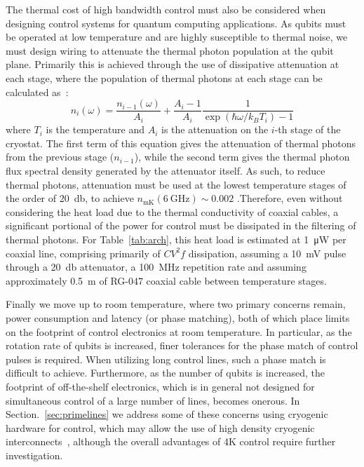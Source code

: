 The thermal cost of high bandwidth control must also be considered when designing control systems for quantum computing applications. As qubits must be operated at low
temperature and are highly susceptible to thermal noise, we must design wiring to attenuate the thermal photon population at the qubit plane. Primarily this is achieved
through the use of dissipative attenuation at each stage, where the population of thermal photons at each stage can be calculated as~\cite{Krinner2019}:
\begin{equation}
  n_i(\omega) = \frac{n_{i-1}(\omega)}{A_i} + \frac{A_i - 1}{A_i}\frac{1}{\exp(\hbar\omega/k_BT_i) - 1}
\end{equation}
where $T_i$ is the temperature and $A_i$ is the attenuation on the $i$-th stage of the cryostat. The first term of this equation gives the attenuation of thermal photons
from the previous stage ($n_{i-1}$), while the second term gives the thermal photon flux spectral density generated by the attenuator itself. As such, to reduce thermal photons,
attenuation must be used at the lowest temperature stages of the order of \SI{20}{\decibel}, to achieve $n_\textrm{mK}(\SI{6}{\giga\hertz}) \sim 0.002$ .Therefore,
even without considering the heat load due to the thermal conductivity of coaxial cables, a significant portional of the power for control must be dissipated
in the filtering of thermal photons. For Table~\ref{tab:arch}, this heat load is estimated at \SI{1}{\micro\watt} per coaxial line, comprising primarily of
$CV^2f$ dissipation, assuming a \SI{10}{\milli\volt} pulse through a \SI{20}{\decibel} attenuator, a \SI{100}{\mega\hertz} repetition rate and assuming approximately
\SI{0.5}{\meter} of RG-047 coaxial cable between temperature stages.

Finally we move up to room temperature, where two primary concerns remain, power consumption and latency (or phase matching), both of which place limits on the footprint
of control electronics at room temperature. In particular, as the rotation rate of qubits is increased, finer tolerances for the phase match of control pulses
is required. When utilizing long control lines, such a phase match is difficult to achieve. Furthermore, as the number of qubits is increased, the footprint of
off-the-shelf electronics, which is in general not designed for simultaneous control of a large number of lines, becomes onerous. In Section.~\ref{sec:primelines}
we address some of these concerns using cryogenic hardware for control, which may allow the use of high density cryogenic interconnects~\cite{Tuckerman_2016}, although
the overall advantages of 4K control require further investigation.

